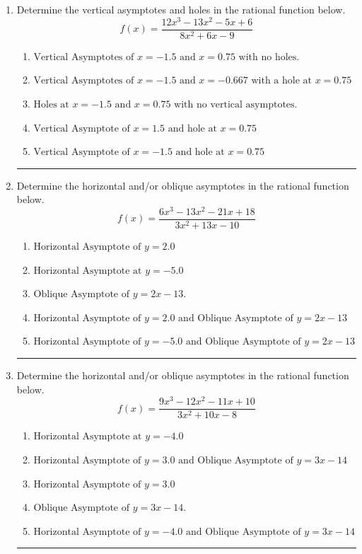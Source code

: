 \documentclass[14pt]{extbook}
\newcommand{\litem}[1]{\item#1\hspace*{-1cm}\rule{\textwidth}{0.4pt}}
\begin{document}
\begin{enumerate}
{\begin{enumerate}[label=\Alph*.]
\end{enumerate} }
\litem{
Determine the vertical asymptotes and holes in the rational function below.\[ f(x) = \frac{12x^{3} -13 x^{2} -5 x + 6}{8x^{2} +6 x -9} \]\begin{enumerate}[label=\Alph*.]
\item \( \text{Vertical Asymptotes of } x = -1.5 \text{ and } x = 0.75 \text{ with no holes.} \)
\item \( \text{Vertical Asymptotes of } x = -1.5 \text{ and } x = -0.667 \text{ with a hole at } x = 0.75 \)
\item \( \text{Holes at } x = -1.5 \text{ and } x = 0.75 \text{ with no vertical asymptotes.} \)
\item \( \text{Vertical Asymptote of } x = 1.5 \text{ and hole at } x = 0.75 \)
\item \( \text{Vertical Asymptote of } x = -1.5 \text{ and hole at } x = 0.75 \)

\end{enumerate} }
\litem{
Determine the horizontal and/or oblique asymptotes in the rational function below.\[ f(x) = \frac{6x^{3} -13 x^{2} -21 x + 18}{3x^{2} +13 x -10} \]\begin{enumerate}[label=\Alph*.]
\item \( \text{Horizontal Asymptote of } y = 2.0  \)
\item \( \text{Horizontal Asymptote at } y = -5.0 \)
\item \( \text{Oblique Asymptote of } y = 2x -13. \)
\item \( \text{Horizontal Asymptote of } y = 2.0 \text{ and Oblique Asymptote of } y = 2x -13 \)
\item \( \text{Horizontal Asymptote of } y = -5.0 \text{ and Oblique Asymptote of } y = 2x -13 \)

\end{enumerate} }
\litem{
Determine the horizontal and/or oblique asymptotes in the rational function below.\[ f(x) = \frac{9x^{3} -12 x^{2} -11 x + 10}{3x^{2} +10 x -8} \]\begin{enumerate}[label=\Alph*.]
\item \( \text{Horizontal Asymptote at } y = -4.0 \)
\item \( \text{Horizontal Asymptote of } y = 3.0 \text{ and Oblique Asymptote of } y = 3x -14 \)
\item \( \text{Horizontal Asymptote of } y = 3.0  \)
\item \( \text{Oblique Asymptote of } y = 3x -14. \)
\item \( \text{Horizontal Asymptote of } y = -4.0 \text{ and Oblique Asymptote of } y = 3x -14 \)


\end{enumerate}}
\end{enumerate}
\end{document}
